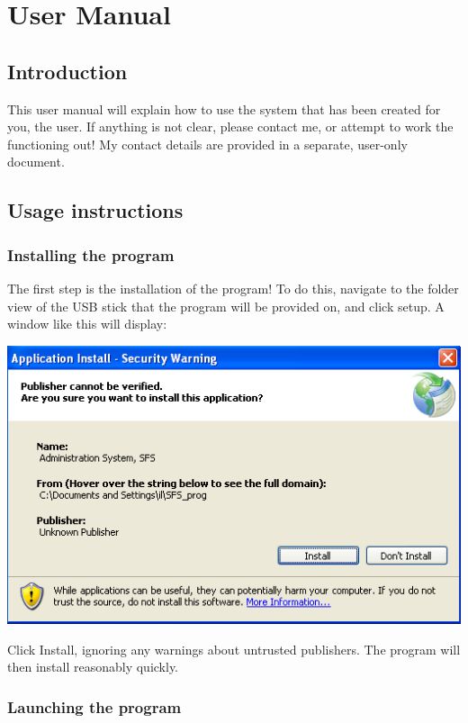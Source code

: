 \chapter{User Manual}

\minitoc

\section{Introduction}

This user manual will explain how to use the system that has been created
for you, the user.  If anything is not clear, please contact me, or attempt
to work the functioning out!  My contact details are provided in a separate,
user-only document.

\section{Usage instructions}
	\subsection{Installing the program}

The first step is the installation of the program!  To do this, navigate to
the folder view of the USB stick that the program will be provided on, and
click setup.  A window like this will display:

\includegraphics[scale=0.5]{um_installoptionwarning}

Click Install, ignoring any warnings about untrusted publishers.  The
program will then install reasonably quickly.

	\subsection{Launching the program}

